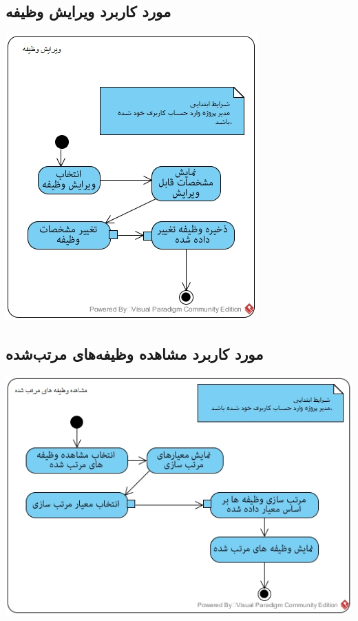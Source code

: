 \documentclass{article}
\begin{document}
\subsection*{مورد کاربرد ویرایش وظیفه}
\vspace{2cm}
\begin{center}
\includegraphics[width=\textwidth]{ActivityDiagrams/19.jpg}
\end{center}

\newpage
\vspace{2cm}
\subsection*{مورد کاربرد مشاهده وظیفه‌های مرتب‌شده}
\vspace{2cm}
\begin{center}
\includegraphics[width=\textwidth]{ActivityDiagrams/20.jpg}
\end{center}
\end{document}
